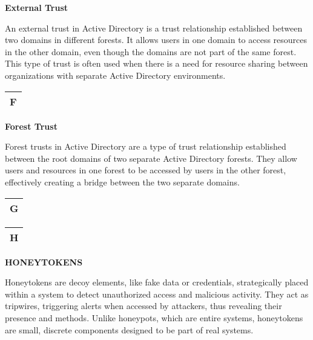 \textbf{External Trust}

An external trust in Active Directory is a trust relationship established between two domains in different forests. It allows users in one domain to access resources in the other domain, even though the domains are not part of the same forest. This type of trust is often used when there is a need for resource sharing between organizations with separate Active Directory environments.

\begin{table}
\justifying

\begin{tabular}{l}
\textbf{F} \\
\hline

\end{tabular}

\end{table}

\textbf{Forest Trust}

Forest trusts in Active Directory are a type of trust relationship established between the root domains of two separate Active Directory forests. They allow users and resources in one forest to be accessed by users in the other forest, effectively creating a bridge between the two separate domains.

\begin{table}
\justifying

\begin{tabular}{l}
\textbf{G} \\
\hline

\end{tabular}

\end{table}

\begin{table}
\justifying

\begin{tabular}{l}
\textbf{H} \\
\hline

\end{tabular}

\end{table}

\textbf{HONEYTOKENS}

Honeytokens are decoy elements, like fake data or credentials, strategically placed within a system to detect unauthorized access and malicious activity. They act as tripwires, triggering alerts when accessed by attackers, thus revealing their presence and methods. Unlike honeypots, which are entire systems, honeytokens are small, discrete components designed to be part of real systems.

